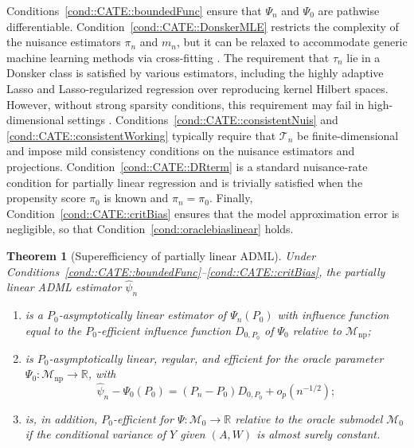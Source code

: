\documentclass[11pt]{article}
\newtheorem{theorem}{Theorem}
\theoremstyle{definition}
\begin{document}
Conditions~\ref{cond::CATE::boundedFunc} ensure that \(\Psi_n\) and \(\Psi_0\) are pathwise differentiable. Condition~\ref{cond::CATE::DonskerMLE} restricts the complexity of the nuisance estimators \(\pi_n\) and \(m_n\), but it can be relaxed to accommodate generic machine learning methods via cross-fitting \citep{vanderLaanRose2011, DoubleML}. The requirement that \(\tau_n\) lie in a Donsker class is satisfied by various estimators, including the highly adaptive Lasso and Lasso-regularized regression over reproducing kernel Hilbert spaces. However, without strong sparsity conditions, this requirement may fail in high-dimensional settings \citep{DoubleML,chernoapproxSparse2019}.
Conditions~\ref{cond::CATE::consistentNuis} and \ref{cond::CATE::consistentWorking} typically require that \(\mathcal{T}_n\) be finite-dimensional and impose mild consistency conditions on the nuisance estimators and projections. Condition~\ref{cond::CATE::DRterm} is a standard nuisance-rate condition for partially linear regression and is trivially satisfied when the propensity score \(\pi_0\) is known and \(\pi_n = \pi_0\). Finally, Condition~\ref{cond::CATE::critBias} ensures that the model approximation error is negligible, so that Condition~\ref{cond::oraclebiaslinear} holds.


\begin{theorem}[Superefficiency of partially linear ADML]
\label{example::theorem::RlearnerLimitDistORACLE}
\label{example::theorem::RlearnerLimitDist}
Under Conditions~\ref{cond::CATE::boundedFunc}--\ref{cond::CATE::critBias}, the partially linear ADML estimator \(\widehat{\psi}_n\)
\begin{enumerate}
    \item is a \(P_0\)-asymptotically linear estimator of \(\Psi_n(P_0)\) with influence function equal to the \(P_0\)-efficient influence function \(D_{0,P_0}\) of \(\Psi_0\) relative to \(\mathcal{M}_{\mathrm{np}}\);
    \item is \(P_0\)-asymptotically linear, regular, and efficient for the oracle parameter \(\Psi_0:\mathcal{M}_{\mathrm{np}}\to\mathbb{R}\), with
    \[
    \widehat{\psi}_n - \Psi_0(P_0) = (P_n - P_0)D_{0,P_0} + o_p(n^{-1/2});
    \]
    \item is, in addition, \(P_0\)-efficient for \(\Psi:\mathcal{M}_0\to\mathbb{R}\) relative to the oracle submodel \(\mathcal{M}_0\) if the conditional variance of \(Y\) given \((A,W)\) is almost surely constant.
\end{enumerate}
\end{theorem}
\end{document}
